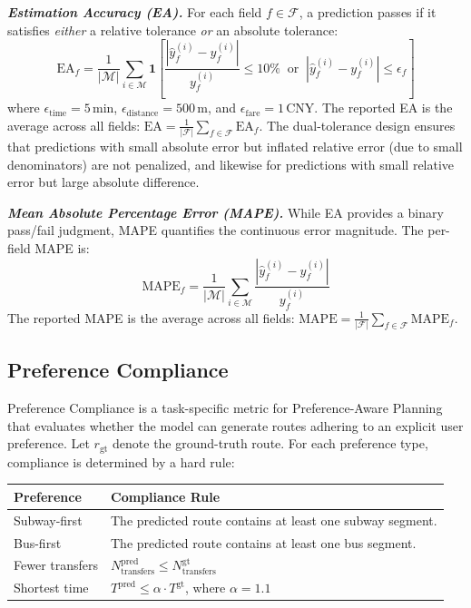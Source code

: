 \documentclass{article}
\begin{document}
\textbf{\textit{Estimation Accuracy (EA).}}
For each field $f \in \mathcal{F}$, a prediction passes if it satisfies \textit{either} a relative tolerance \textit{or} an absolute tolerance:
\begin{equation}
\text{EA}_f = \frac{1}{|\mathcal{M}|}\sum_{i \in \mathcal{M}} \mathbf{1}\!\left[\frac{|\hat{y}_f^{(i)} - y_f^{(i)}|}{y_f^{(i)}} \leq 10\% \;\;\text{or}\;\; |\hat{y}_f^{(i)} - y_f^{(i)}| \leq \epsilon_f\right]
\end{equation}
where $\epsilon_{\text{time}} = 5\,\text{min}$, $\epsilon_{\text{distance}} = 500\,\text{m}$, and $\epsilon_{\text{fare}} = 1\,\text{CNY}$. The reported EA is the average across all fields: $\text{EA} = \frac{1}{|\mathcal{F}|}\sum_{f \in \mathcal{F}} \text{EA}_f$. The dual-tolerance design ensures that predictions with small absolute error but inflated relative error (due to small denominators) are not penalized, and likewise for predictions with small relative error but large absolute difference.

\textbf{\textit{Mean Absolute Percentage Error (MAPE).}} While EA provides a binary pass/fail judgment, MAPE quantifies the continuous error magnitude. The per-field MAPE is:
\begin{equation}
\text{MAPE}_f = \frac{1}{|\mathcal{M}|}\sum_{i \in \mathcal{M}} \frac{|\hat{y}_f^{(i)} - y_f^{(i)}|}{y_f^{(i)}}
\end{equation}
The reported MAPE is the average across all fields: $\text{MAPE} = \frac{1}{|\mathcal{F}|}\sum_{f \in \mathcal{F}} \text{MAPE}_f$.

\subsection{Preference Compliance}

Preference Compliance is a task-specific metric for Preference-Aware Planning that evaluates whether the model can generate routes adhering to an explicit user preference. Let $r_{\text{gt}}$ denote the ground-truth route. For each preference type, compliance is determined by a hard rule:

\begin{center}
\small
\begin{tabular}{lp{8cm}}
\toprule
\textbf{Preference} & \textbf{Compliance Rule} \\
\midrule
Subway-first & The predicted route contains at least one subway segment. \\
Bus-first & The predicted route contains at least one bus segment. \\
Fewer transfers & $N_{\text{transfers}}^{\text{pred}} \leq N_{\text{transfers}}^{\text{gt}}$ \\
Shortest time & $T^{\text{pred}} \leq \alpha \cdot T^{\text{gt}}$, where $\alpha = 1.1$ \\
\bottomrule
\end{tabular}
\end{center}
\end{document}

